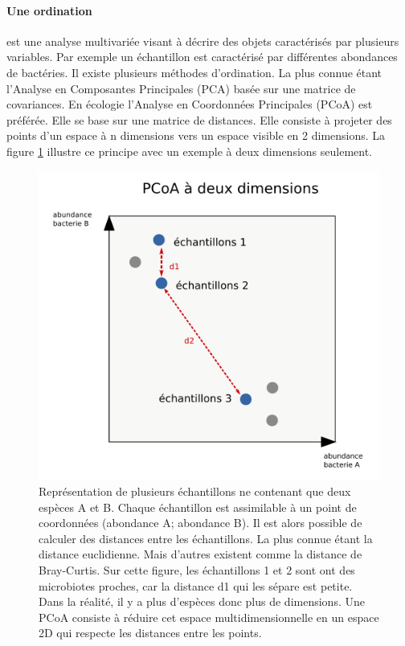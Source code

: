 \documentclass[12pt,a4paper]{article}
\begin{document}
\paragraph{Une ordination} est une analyse multivariée visant à décrire des objets caractérisés par plusieurs variables. Par exemple un échantillon est caractérisé par différentes abondances de bactéries. Il existe plusieurs méthodes d'ordination. La plus connue étant l'Analyse en Composantes Principales (PCA) basée sur une matrice de covariances. En écologie l'Analyse en Coordonnées Principales (PCoA) est préférée. Elle se base sur une matrice de distances. Elle consiste à projeter des points d'un espace à n dimensions vers un espace visible en 2 dimensions.
La figure \ref{pcoatuto} illustre ce principe avec un exemple à deux dimensions seulement.

\begin{figure}[!h]
\begin{center}
\includegraphics[scale=0.6]{img/pcoatuto.png}\hfill
\end{center}
\caption{Représentation de plusieurs échantillons ne contenant que deux espèces A et B. Chaque échantillon est assimilable à un point de coordonnées (abondance A; abondance B). Il est alors possible de calculer des distances entre les échantillons. La plus connue étant la distance euclidienne. Mais d'autres existent comme la distance de Bray-Curtis. Sur cette figure, les échantillons 1 et 2 sont ont des microbiotes proches, car la distance d1 qui les sépare est petite. Dans la réalité, il y a plus d'espèces donc plus de dimensions. Une PCoA consiste à réduire cet espace multidimensionnelle en un espace 2D qui respecte les distances entre les points. }
\label{pcoatuto}
\end{figure}
\newpage
\end{document}
